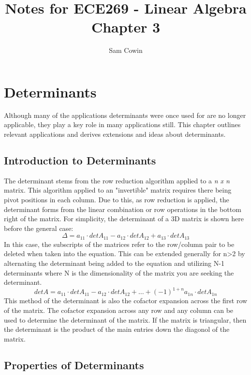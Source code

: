 \documentclass[12pt]{article}
\begin{document}
\setlength{\abovedisplayskip}{0pt}
\setlength{\belowdisplayskip}{0pt}
\setlength{\abovedisplayshortskip}{0pt}
\setlength{\belowdisplayshortskip}{0pt}

\title{Notes for ECE269 - Linear Algebra \\
\large Chapter 3}
\author{Sam Cowin}
\maketitle

\section{Determinants}
Although many of the applications determinants were once used for are no longer applicable, they play a key role in many applications still. This chapter outlines %
relevant applications and derives extensions and ideas about determinants. 
\subsection{Introduction to Determinants}
The determinant stems from the row reduction algorithm applied to a \textit{n x n} matrix. This algorithm applied to an "invertible" matrix requires there %
being pivot positions in each column. Due to this, as row reduction is applied, the determinant forms from the linear combination or row operations in the bottom right %
of the matrix. 
\newline
\newline
For simplicity, the determinant of a 3D matrix is shown here before the general case: 
\newline
$$
\Delta=a_{11}\cdot detA_{11}-a_{12}\cdot detA_{12}+a_{13}\cdot detA_{13}
$$
\newline
In this case, the subscripts of the matrices refer to the row/column pair to be deleted when taken into the equation. This can be extended generally for n>2 %
by alternating the determinant being added to the equation and utilizing N-1 determinants where N is the dimensionality of the matrix you are seeking the determinant. %
\newline
$$
detA=a_{11}\cdot detA_{11}-a_{12}\cdot detA_{12}+\dots+(-1)^{1+n}a_{1n}\cdot detA_{1n}
$$
\newline
This method of the determinant is also the cofactor expansion across the first row of the matrix. The cofactor expansion across any row and any column can be used to %
determine the determinant of the matrix. If the matrix is triangular, then the determinant is the product of the main entries down the diagonol of the matrix. 
\subsection{Properties of Determinants}
\end{document}
